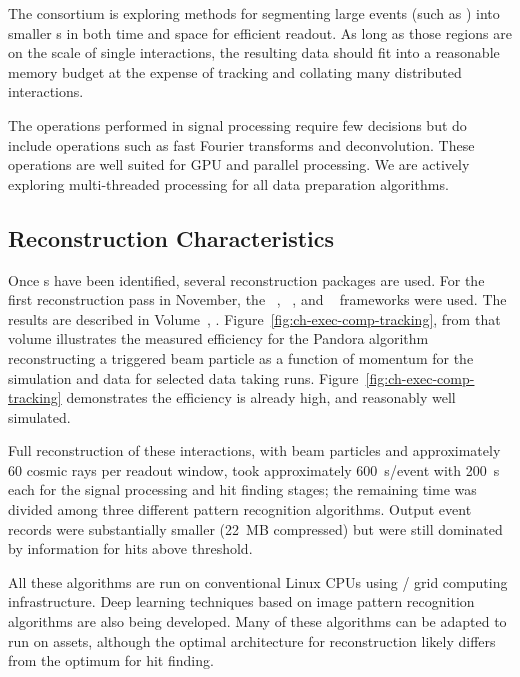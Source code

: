 The  consortium is exploring methods for segmenting large events (such as ) into  smaller s in both time and space for efficient readout.  As long as those regions are on the scale of single interactions, the resulting data should fit into a reasonable memory budget at the expense of tracking and collating many distributed interactions. 

The operations performed in signal processing require few decisions but do include operations such as fast Fourier transforms and deconvolution.  These operations are well suited for GPU and parallel processing. We are actively exploring multi-threaded processing for all data preparation algorithms. 


\subsection{Reconstruction Characteristics}

Once s have been identified, several \threed  reconstruction packages are used. For the first reconstruction pass in November, the  ~\cite{Acciarri:2017hat}, ~\cite{wirecell}, and ~\cite{ref:PMA}  frameworks were used. The results are described in Volume~\volnumberphysics{}, \voltitlephysics{}. 
Figure~\ref{fig:ch-exec-comp-tracking}, from that volume illustrates the measured efficiency for the Pandora algorithm reconstructing a triggered beam particle as a function of momentum for the simulation and data for selected data taking runs. Figure~\ref{fig:ch-exec-comp-tracking} demonstrates the efficiency is already high, and reasonably well simulated.

Full reconstruction of these  interactions, with beam particles and approximately 60 cosmic rays per readout window, took  approximately \SI{600}{s/event} with \SI{200}{s} each for the signal processing and hit finding stages; the remaining time was divided among three different pattern recognition algorithms. Output event records were substantially smaller (\SI{22}{MB} compressed) but were still dominated by information for  hits above threshold. 

All these algorithms are run on conventional %
Linux CPUs using / grid computing  infrastructure. Deep learning techniques based on image pattern recognition algorithms are also being developed. Many of these algorithms can be adapted to run on  assets, although the optimal architecture for \threed reconstruction likely differs from the optimum for hit finding.


